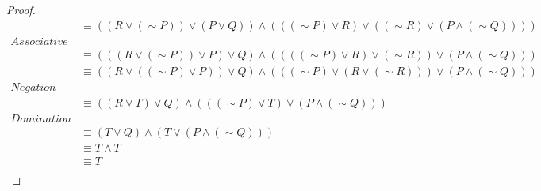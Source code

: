 \documentclass[12pt]{article}
\newenvironment{problem}[2][Problem]{\begin{trivlist}
		\item[\hskip \labelsep {\bfseries #1}\hskip \labelsep {\bfseries #2.}]}{\end{trivlist}}
\newenvironment{solution}[2][Solution]{\begin{trivlist}
		\item[\hskip \labelsep {\bfseries #1}\hskip \labelsep {\bfseries #2.}]}{\end{trivlist}}
\begin{document}
\begin{problem}{49}
\begin{solution}{}
\begin{proof}
\begin{align*}
			& \equiv ((R\vee (\sim P)) \vee (P\vee Q)) \wedge (((\sim P)\vee R) \vee( (\sim R) \vee (P \wedge (\sim Q))) )\\
		\textit{Associative Laws}\\
			& \equiv (((R\vee (\sim P)) \vee P)\vee Q) \wedge ((((\sim P)\vee R) \vee (\sim R)) \vee (P \wedge (\sim Q) ))\\
			& \equiv ((R\vee ((\sim P) \vee P))\vee Q) \wedge (((\sim P)\vee (R \vee (\sim R))) \vee (P \wedge (\sim Q) ))\\
		\textit{Negation Laws}\\
			& \equiv ((R\vee T)\vee Q) \wedge (((\sim P)\vee T) \vee (P \wedge (\sim Q) ))\\
		\textit{Domination Laws}\\
			& \equiv (T\vee Q) \wedge (T \vee (P \wedge (\sim Q)) )\\
			& \equiv T\wedge T \\
			& \equiv T \\
	\end{align*}
\end{proof}
	\end{solution}
\end{problem}
\end{document}

